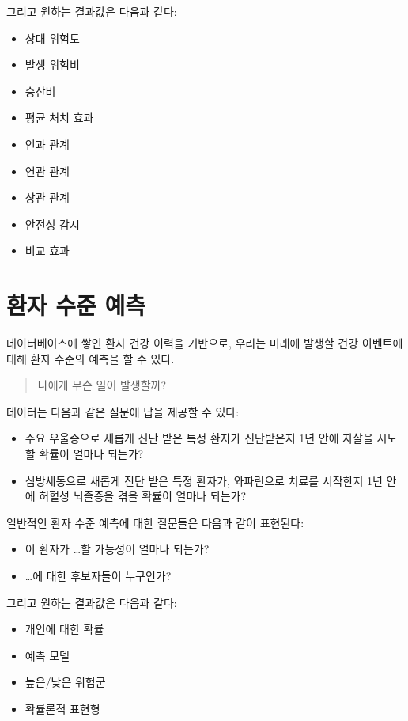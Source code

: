 \documentclass[11pt]{book}
\providecommand{\tightlist}{%
  \setlength{\itemsep}{0pt}\setlength{\parskip}{0pt}}
\theoremstyle{definition}
\theoremstyle{definition}
\theoremstyle{definition}
\theoremstyle{remark}
\begin{document}
그리고 원하는 결과값은 다음과 같다:

\begin{itemize}
\tightlist
\item
  상대 위험도
\item
  발생 위험비
\item
  승산비
\item
  평균 처치 효과
\item
  인과 관계
\item
  연관 관계
\item
  상관 관계
\item
  안전성 감시
\item
  비교 효과
\end{itemize}

\section{환자 수준 예측}\label{--}


데이터베이스에 쌓인 환자 건강 이력을 기반으로, 우리는 미래에 발생할 건강
이벤트에 대해 환자 수준의 예측을 할 수 있다.

\begin{quote}
나에게 무슨 일이 발생할까?
\end{quote}

데이터는 다음과 같은 질문에 답을 제공할 수 있다:

\begin{itemize}
\tightlist
\item
  주요 우울증으로 새롭게 진단 받은 특정 환자가 진단받은지 1년 안에
  자살을 시도할 확률이 얼마나 되는가?
\item
  심방세동으로 새롭게 진단 받은 특정 환자가, 와파린으로 치료를 시작한지
  1년 안에 허혈성 뇌졸증을 겪을 확률이 얼마나 되는가?
\end{itemize}

일반적인 환자 수준 예측에 대한 질문들은 다음과 같이 표현된다:

\begin{itemize}
\tightlist
\item
  이 환자가 \ldots{}할 가능성이 얼마나 되는가?
\item
  \ldots{}에 대한 후보자들이 누구인가?
\end{itemize}

그리고 원하는 결과값은 다음과 같다:

\begin{itemize}
\tightlist
\item
  개인에 대한 확률
\item
  예측 모델
\item
  높은/낮은 위험군
\item
  확률론적 표현형
\end{itemize}
\end{document}
